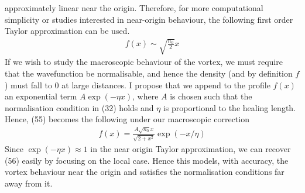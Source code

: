 \documentclass{article}
\begin{document}
approximately linear near the origin. Therefore, for more computational simplicity or studies 
interested in near-origin behaviour,
 the following first order Taylor
approximation can be used. 
\begin{align}
    f(x)\sim \sqrt{\frac{n_0}{2}}x
\end{align}
If we wish to study the macroscopic behaviour of the vortex, we must require that the wavefunction 
be normalisable, and hence the density (and by definition $f$) must fall to 0 at large distances. I propose that we append to 
the profile $f(x)$ an exponential term $A\exp(-\eta x)$, where $A$ is chosen such that the normalisation condition in (32) holds
and $\eta$ is proportional to the healing length. Hence, (55) becomes the following under our macroscopic correction 
\begin{align}
    f(x)=\frac{A\sqrt{n_0}x}{\sqrt{2+x^2}}\exp(-x/\eta)
\end{align}
Since $\exp(-\eta x)\approx 1$ in the near origin Taylor approximation, we can recover (56) easily by focusing 
on the local case. Hence this models, with accuracy, the vortex behaviour near the origin and satisfies the normalisation 
conditions far away from it. 
\end{document}
